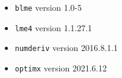 \documentclass[11pt, a4paper]{article}
\newcommand{\PS}[1]{{\noindent \color{red} \bf \#PS: #1}}
\theoremstyle{example} \newtheorem{example}{Example}[section]
\theoremstyle{theorem} \newtheorem{theorem}{Theorem}[section]
\theoremstyle{theorem }\newtheorem{proposition}{Proposition}[section]
\theoremstyle{theorem }\newtheorem{corollary}{Corollary}[section]
\begin{document}
	\begin{itemize}
		\item \texttt{blme} \citep{blme} version 1.0-5 
		\item \texttt{lme4} \citep{lme4} version 1.1.27.1
		\item \texttt{numderiv} \citep{numDeriv} version 2016.8.1.1
		\item \texttt{optimx} \citep{nash+varadhan:2011} version 2021.6.12
	\end{itemize}
\newpage
\end{document}
